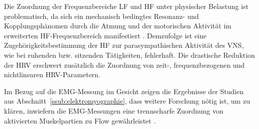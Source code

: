 Die Zuordnung der Frequenzbereiche \acs{LF} und \acs{HF} unter physischer Belastung ist problematisch, da sich ein mechanisch bedingtes Resonanz- und Kopplungsphänomen durch die Atmung und der motorischen Aktivität im erweiterten \acs{HF}-Frequenzbereich manifestiert \citep[][S.~62]{Hoos2010}. Demzufolge ist eine Zugehörigkeitsbestimmung der \acs{HF} zur parasympathischen Aktivität des \ac{VNS}, wie bei ruhenden bzw. sitzenden Tätigkeiten, fehlerhaft. Die drastische Reduktion der \ac{HRV} erschwert zusätzlich die Zuordnung von zeit-, frequenzbezogenen und nichtlinearen \ac{HRV}-Parametern.

Im Bezug auf die \ac{EMG}-Messung im Gesicht zeigen die Ergebnisse der Studien aus Abschnitt~\ref{ssub:elektromyographie}, dass weitere Forschung nötig ist, um zu klären, inwiefern die \ac{EMG}-Messungen eine trennscharfe Zuordnung von aktivierten Muskelpartien zu Flow gewährleistet \citep{Peifer2012}.

